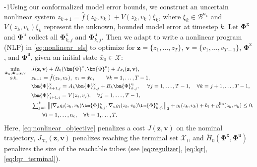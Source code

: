 \documentclass{l4dc2026}
\newcommand{\antoine}[1]{{\textcolor[rgb]{1,0,0}{\textsf{[Antoine: {#1}]}}}}
\newcommand{\Z}{\mathbf{z}}
\newcommand{\V}{\mathbf{v}}
\newcommand{\red}[1]{{\color{red}{#1}}}
\newcommand{\Px}{\bm{\Phi}^{\mathrm{x}}}
\newcommand{\Pu}{\bm{\Phi}^{\mathrm{u}}}
\renewcommand{\red}[1]{{\color{red}{#1}}}
\begin{document}
\looseness-1Using our conformalized model error bounds, we construct an uncertain nonlinear system $z_{k+1} = \hat{f}(z_k,v_k) + V(z_k,v_k)\xi_k$,
where $\xi_k \in \mathcal{B}^{n_x}$ and $ V(z_k,v_k)\xi_k$ represent the unknown, bounded model error at timestep $k$. 
Let $\Px$ and $\Pu$ collect all $\Px_{k,j}$ and $\Pu_{k,j}$. Then we adapt \cite{leeman2025robust_TAC} to write a nonlinear program (NLP) in \eqref{eq:nonlinear_sls} to optimize for $\Z = \{z_1,\dots,z_{T}\}$, $\V = \{v_1,\dots,v_{T-1}\}$, $\Px$, and $\Pu$, given an initial state $\bar{x}_0 \in \mathcal{X}$: 
\begin{subequations}\small
\label{eq:nonlinear_sls}
\begin{align}
\min_{\substack{\mathbf{\Phi}_{\mathbf{x}},\mathbf{\Phi}_{\mathrm{u}},\mathbf{z}, \mathbf{v}}}\quad &  J(\mathbf{z},\mathbf{v}) +  \tilde H_0(\Px, \Pu) + J_{\mathcal{X}_\textrm{f}}(\textbf{z}, \textbf{v}),\label{eq:nonlinear_objective}\\[-6pt]
\text { s.t. }\quad\quad &  {z}_{k+1}= \hat{f}(z_k,v_k),~ {z}_1 = \bar x_0,\quad\quad \forall k = 1,\ldots, T-1,\label{eq:nonlinear_nominal}\\
&\Px_{k+1,j} =A_k  \Px_{k,j} + B_k \Pu_{k,j},\ \quad \forall j = 1,\ldots, T-1,\quad \forall k = j+1,\ldots,T-1,\label{eq:SLP_nonlinear}\\
&\Px_{j+1,j} = V(z_j, v_j),\quad \forall j = 1,\ldots, T-1,\label{eq:SLP_ic_nonlinear}\\%
& \textstyle\sum_{j=1}^{k}\big\Vert[\nabla_xg_{i}(z_k,v_k)\Px_{k,j}, \nabla_ug_{i}(z_k,v_k)\Pu_{k,j}]\big\Vert_{2} + g_{i}(z_k,v_k) + b_{i} + g_i^\textrm{lin}(z_k,v_k)  \leq 0,\label{eq:SLC_nonlinear}\\
&  \quad\quad \forall i =1, \ldots, n_c,\quad \forall k= 1,\ldots,T. \nonumber
\end{align}
\end{subequations}
\noindent Here, \eqref{eq:nonlinear_objective} penalizes a cost $J(\mathbf{z},\mathbf{v})$ on the nominal trajectory,  $J_{\mathcal{X}_\textrm{f}}(\textbf{z}, \textbf{v})$ penalizes reaching the terminal set $\mathcal{X}_\textrm{f}$, and $\tilde H_0(\Px, \Pu)$ penalizes the size of the reachable tubes (see \eqref{eq:regulizer}, \eqref{eq:lqr}, \eqref{eq:lqr_terminal}). 
\end{document}
